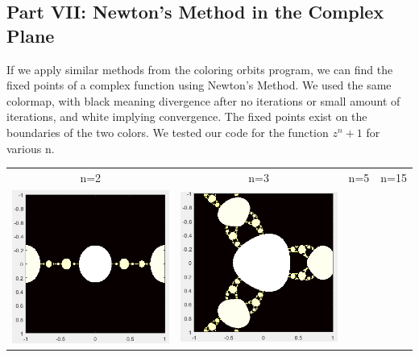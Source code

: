 \documentclass[11pt]{article}
\theoremstyle{plain}
\theoremstyle{definition}
\begin{document}
\subsection*{Part VII: Newton’s Method in the Complex Plane}

If we apply similar methods from the coloring orbits program, we can find the fixed points of a complex function using Newton’s Method. We used the same colormap, with black meaning divergence after no iterations or small amount of iterations, and white implying convergence. The fixed points exist on the boundaries of the two colors. We tested our code for the function $ z^n +1 $ for various n.\\

\begin{tabular}{c c c c}
	n=2                                &n=3                         &n=5	& n=15\\
	\includegraphics*[scale = 0.23]{Plot13.png} 
	& \includegraphics*[scale = 0.23]{Plot14.png} 

\end{tabular}
\end{document}
